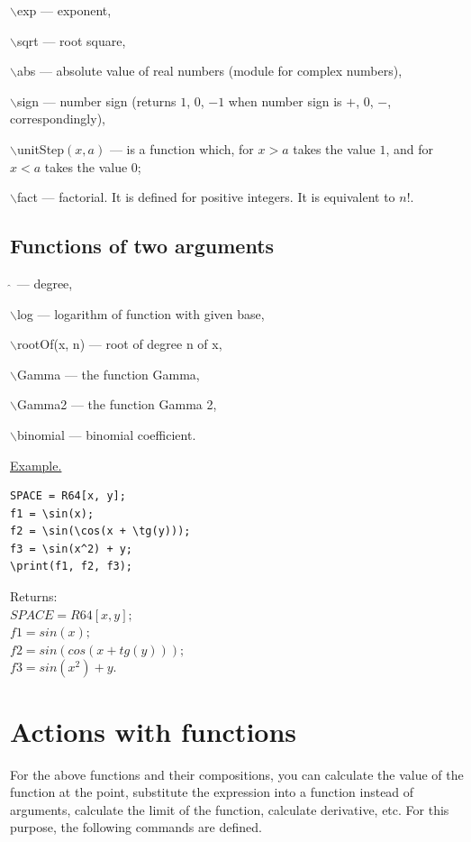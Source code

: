  $\backslash$exp --- exponent,  

 $\backslash$sqrt --- root square, 

 $\backslash$abs --- absolute value of real numbers (module for complex numbers),

 $\backslash$sign --- number sign (returns $1$, $0$, $-1$ when number sign is $+$, $0$, $-$, correspondingly),
 
 $\backslash$unitStep$(x,a)$ --- is a function which, for $ x> a $ takes the value $ 1 $, and
for $ x <a $ takes the value $ 0 $;

 $\backslash$fact --- factorial.  It is defined for positive integers. It is equivalent to  $n!$.

\subsection{Functions of two arguments} 
\hspace*{4mm}  $\widehat{\ }{}$ --- degree, 

 $\backslash$log --- logarithm of function with given base, 

 $\backslash$rootOf(x, n) --- root of degree n of x, 

 $\backslash$Gamma --- the function Gamma, 

 $\backslash$Gamma2 --- the function Gamma 2,  

 $\backslash$binomial --- binomial coefficient. 


\smallskip

\underline{Example.}

\vspace*{-3mm}
\begin{verbatim}
SPACE = R64[x, y];
f1 = \sin(x);
f2 = \sin(\cos(x + \tg(y)));
f3 = \sin(x^2) + y;
\print(f1, f2, f3);
\end{verbatim}\vspace*{-3mm}

Returns:\\
$SPACE=R64[x,y];$\\
$f1 = sin(x);$\\
$f2 = sin(cos(x+tg(y)));$\\
$f3 = sin(x^{2})+y.$

\section{Actions with functions}

For the above functions and their compositions, you can calculate the value of the function at the point,   substitute the expression into a function instead of arguments, calculate the limit of the function,  calculate derivative, etc. For this purpose, the following commands are defined.



